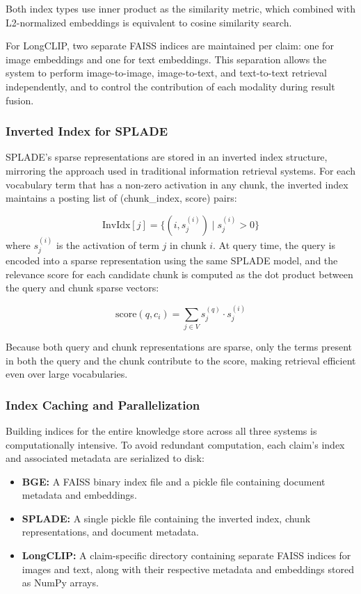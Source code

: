 Both index types use inner product as the similarity metric, which combined with L2-normalized embeddings is equivalent to cosine similarity search.

For LongCLIP, two separate FAISS indices are maintained per claim: one for image embeddings and one for text embeddings. This separation allows the system to perform image-to-image, image-to-text, and text-to-text retrieval independently, and to control the contribution of each modality during result fusion.

\subsubsection{Inverted Index for SPLADE}

SPLADE's sparse representations are stored in an inverted index structure, mirroring the approach used in traditional information retrieval systems. For each vocabulary term that has a non-zero activation in any chunk, the inverted index maintains a posting list of (chunk\_index, score) pairs:

\begin{equation}
    \text{InvIdx}[j] = \{(i, s_j^{(i)}) \mid s_j^{(i)} > 0\}
\end{equation}
where $s_j^{(i)}$ is the activation of term $j$ in chunk $i$. At query time, the query is encoded into a sparse representation using the same SPLADE model, and the relevance score for each candidate chunk is computed as the dot product between the query and chunk sparse vectors:

\begin{equation}
    \text{score}(q, c_i) = \sum_{j \in V} s_j^{(q)} \cdot s_j^{(i)}
\end{equation}

Because both query and chunk representations are sparse, only the terms present in both the query and the chunk contribute to the score, making retrieval efficient even over large vocabularies.

\subsubsection{Index Caching and Parallelization}

Building indices for the entire knowledge store across all three systems is computationally intensive. To avoid redundant computation, each claim's index and associated metadata are serialized to disk:

\begin{itemize}
    \item \textbf{BGE:} A FAISS binary index file and a pickle file containing document metadata and embeddings.
    \item \textbf{SPLADE:} A single pickle file containing the inverted index, chunk representations, and document metadata.
    \item \textbf{LongCLIP:} A claim-specific directory containing separate FAISS indices for images and text, along with their respective metadata and embeddings stored as NumPy arrays.
\end{itemize}

